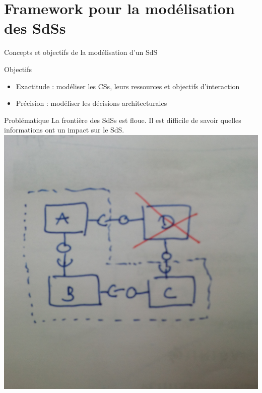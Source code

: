 \section{Framework pour la modélisation des SdSs}

\begin{frame}{Concepts et objectifs de la modélisation d'un SdS}

\begin{block}{Objectifs }
\begin{itemize}
\item Exactitude : modéliser les CSs, leurs ressources et objectifs
d'interaction
\item Précision : modéliser les décisions architecturales 
\end{itemize}
\end{block}

\begin{block}{Problématique}
La frontière des SdSs est floue. Il est difficile de savoir quelles
informations ont un impact sur le SdS.\\
\centering
\includegraphics[scale=0.025]{imgs/slide_section1_probleme_frontiere.jpg}
\end{block}


\end{frame}
